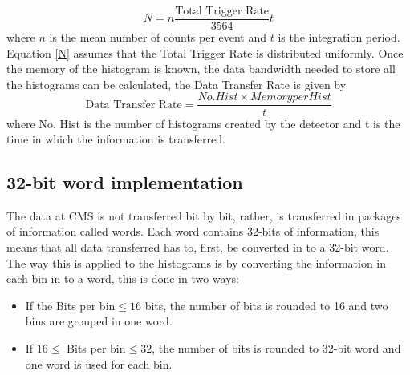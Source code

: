\begin{equation}
    N=n\frac{\text {Total Trigger Rate}}{3564}t
    \label{N}
\end{equation}
where $n$ is the mean number of counts per event and $t$ is the integration period. Equation \ref{N} assumes that the Total Trigger Rate is distributed uniformly. Once the memory of the histogram is known, the data bandwidth needed to store all the histograms can be calculated, the Data Transfer Rate is given by 
\begin{equation}
    \text {Data Transfer Rate}=\frac{No. Hist\times Memory per Hist}{t}
    \label{drate}
\end{equation}
where No. Hist is the number of histograms created by the detector and t is the time in which the information is transferred.\\

\subsection*{32-bit word implementation}
The data at CMS is not transferred bit by bit, rather, is transferred in packages of information called words. Each word contains 32-bits of information, this means that all data transferred has to, first, be converted in to a 32-bit word. The way this is applied to the histograms is by converting the information in each bin in to a word, this is done in two ways:
\begin{itemize}
    \item If the Bits per bin$\leq16$ bits, the number of bits is
rounded to 16 and two bins are grouped in one word.
\item If $16\leq$ Bits per bin$\leq32$,  the number of bits is
rounded to 32-bit word and one word is used for each bin.
\end{itemize}

